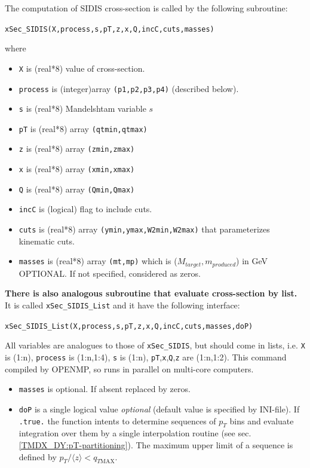 \documentclass[prd,nofootinbib,eqsecnum,final]{revtex4}
\renewcommand{\(}{\left(}
\renewcommand{\)}{\right)}
\renewcommand{\[}{\left[}
\renewcommand{\]}{\right]}
\newcommand{\blue}[1]{{\color{blue} #1}}
\begin{document}
\begin{tcolorbox}
The computation of SIDIS cross-section is called by the following subroutine:

\begin{center}
\texttt{xSec\_SIDIS(X,process,s,pT,z,x,Q,incC,cuts,masses)}
\end{center}

where
\begin{itemize}
\item \texttt{X} is (real*8) value of cross-section.
\item \texttt{process} is (integer)array \texttt{(p1,p2,p3,p4)} (described below).
\item \texttt{s} is (real*8) Mandelshtam variable $s$
\item \texttt{pT} is (real*8) array \texttt{(qtmin,qtmax)}
\item \texttt{z} is (real*8) array \texttt{(zmin,zmax)}
\item \texttt{x} is (real*8) array \texttt{(xmin,xmax)}
\item \texttt{Q} is (real*8) array \texttt{(Qmin,Qmax)}
\item \texttt{incC} is (logical) flag to include cuts.
\item \texttt{cuts} is (real*8) array \texttt{(ymin,ymax,W2min,W2max)} that parameterizes kinematic cuts.
\item \texttt{masses} is (real*8) array \texttt{(mt,mp)} which is ($M_{target},m_{produced}$) in GeV \blue{OPTIONAL}. If not specified, considered as zeros.
\end{itemize}
\end{tcolorbox}

\begin{tcolorbox}
\textbf{\blue{There is also analogous subroutine that evaluate cross-section by list.}} It is called \texttt{xSec\_SIDIS\_List} and it have the following interface:

\begin{center}
\texttt{xSec\_SIDIS\_List(X,process,s,pT,z,x,Q,incC,cuts,masses,doP)}
\end{center}
All variables are analogues to those of \texttt{xSec\_SIDIS}, but should come in lists, i.e. \texttt{X} is (1:n), \texttt{process} is (1:n,1:4), \texttt{s} is (1:n), \texttt{pT},\texttt{x},\texttt{Q},\texttt{z} are (1:n,1:2). This command compiled by OPENMP, so runs in parallel on multi-core computers.
\begin{itemize}
\item \texttt{masses} is optional. If absent replaced by zeros.
\item \texttt{doP} is a single logical value \textit{optional} (default value is specified by INI-file). If \texttt{.true.} the function intents to determine sequences of $p_T$ bins and evaluate integration over them by a single interpolation routine (see sec.\ref{TMDX_DY:pT-partitioning}). The maximum upper limit of a sequence is defined by $p_T/\langle z\rangle<q_{T\text{MAX}}$.
\end{itemize}
\end{tcolorbox}
\end{document}
